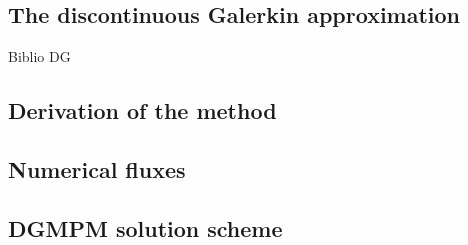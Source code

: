 \subsection{The discontinuous Galerkin approximation}
Biblio DG
\subsection{Derivation of the method}

\subsection{Numerical fluxes}
\subsection{DGMPM solution scheme}



